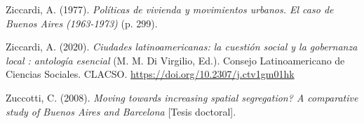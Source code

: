 \documentclass[
  spanish,
  a4paper,%
  chapterprefix=true,%
  DIV=calc,%
  twoside]{scrbook}%
\newlength{\cslhangindent}
\newenvironment{CSLReferences}[2] %
 {\begin{list}{}{%
  \setlength{\itemindent}{0pt}
  \setlength{\leftmargin}{0pt}
  \setlength{\parsep}{0pt}
  \ifodd #1
   \setlength{\leftmargin}{\cslhangindent}
   \setlength{\itemindent}{-1\cslhangindent}
  \fi
  \setlength{\itemsep}{#2\baselineskip}}}
 {\end{list}}
\begin{document}
\begin{CSLReferences}{1}{0}
Ziccardi, A. (1977). \emph{Políticas de vivienda y movimientos urbanos. El caso de Buenos Aires (1963-1973)} (p. 299).

Ziccardi, A. (2020). \emph{Ciudades latinoamericanas: la cuestión social y la gobernanza local : antología esencial} (M. M. Di Virgilio, Ed.). Consejo Latinoamericano de Ciencias Sociales. CLACSO. \url{https://doi.org/10.2307/j.ctv1gm01hk}

Zuccotti, C. (2008). \emph{Moving towards increasing spatial segregation? A comparative study of Buenos Aires and Barcelona} {[}Tesis doctoral{]}.

\end{CSLReferences}
\end{document}
